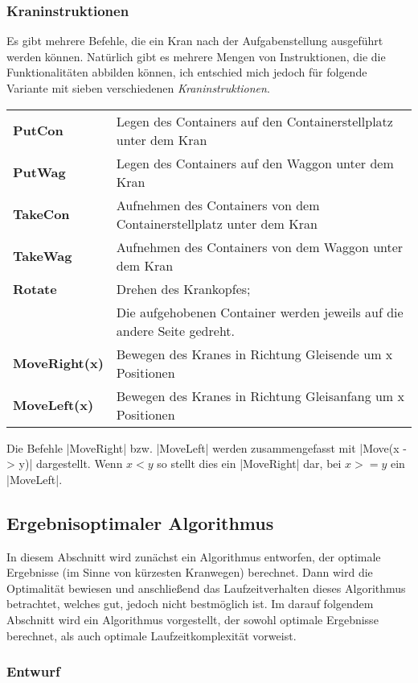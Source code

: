 \subsubsection{Kraninstruktionen}
Es gibt mehrere Befehle, die ein Kran nach der Aufgabenstellung ausgeführt werden können.
Natürlich gibt es mehrere Mengen von Instruktionen, die die Funktionalitäten abbilden können, ich entschied mich jedoch für folgende Variante mit sieben verschiedenen \emph{Kraninstruktionen}.

\begin{center}
\begin{tabular}{ll}
 \textbf{PutCon} & Legen des Containers auf den Containerstellplatz unter dem Kran \\
 \textbf{PutWag} & Legen des Containers auf den Waggon unter dem Kran \\
 \textbf{TakeCon} & Aufnehmen des Containers von dem Containerstellplatz unter dem Kran \\
 \textbf{TakeWag} & Aufnehmen des Containers von dem Waggon unter dem Kran \\
 \textbf{Rotate} & Drehen des Krankopfes; \\
                 & Die aufgehobenen Container werden jeweils auf die andere Seite gedreht. \\
 \textbf{MoveRight(x)} & Bewegen des Kranes in Richtung Gleisende um x Positionen \\
 \textbf{MoveLeft(x)}  & Bewegen des Kranes in Richtung Gleisanfang um x Positionen \\
\end{tabular}
\end{center}

Die Befehle |MoveRight| bzw. |MoveLeft| werden zusammengefasst mit |Move(x -> y)| dargestellt.
Wenn $x < y$ so stellt dies ein |MoveRight| dar, bei $x >= y$ ein |MoveLeft|.

\subsection{Ergebnisoptimaler Algorithmus}
In diesem Abschnitt wird zunächst ein Algorithmus entworfen, der optimale Ergebnisse (im Sinne von kürzesten Kranwegen) berechnet.
Dann wird die Optimalität bewiesen und anschließend das Laufzeitverhalten dieses Algorithmus betrachtet, welches gut, jedoch nicht bestmöglich ist.
Im darauf folgendem Abschnitt wird ein Algorithmus vorgestellt, der sowohl optimale Ergebnisse berechnet, als auch optimale Laufzeitkomplexität vorweist.
\subsubsection{Entwurf}
\label{slow_cycler}
